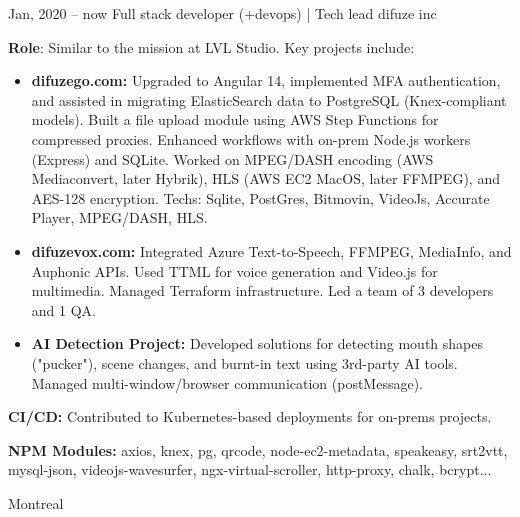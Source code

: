 \documentclass[
  a4paper,
   maincolor=cvblue,
   sectioncolor=cvblue,
   sidebarwidth=0.323\paperwidth,
]{fortysecondscv}
\begin{document}
\newpage
\restoregeometry
{}\paperwidth

\makefrontsidebar

\vspace*{-3.5em} %



\begin{cvtableNew}
  \cvitemRightNew
      {Jan, 2020 – now} %
      {Full stack developer (+devops) | Tech lead} %
      {difuze inc} %
      {
        \vspace{0.1pt} %
        \fontsize{10.8pt}{12pt}\selectfont %
        \textbf{Role}: Similar to the mission at LVL Studio. Key projects include:\vspace{5pt}

        \begin{itemize}[itemsep=-1mm, topsep=0pt, leftmargin=8pt]
          \item \textbf{difuzego.com:} Upgraded to Angular 14, implemented MFA authentication, and assisted in migrating ElasticSearch data to PostgreSQL (Knex-compliant models). Built a file upload module using AWS Step Functions for compressed proxies. Enhanced workflows with on-prem Node.js workers (Express) and SQLite. Worked on MPEG/DASH encoding (AWS Mediaconvert, later Hybrik), HLS (AWS EC2 MacOS, later FFMPEG), and AES-128 encryption. Techs: Sqlite, PostGres, Bitmovin, VideoJs, Accurate Player, MPEG/DASH, HLS.\vspace{5pt}
          \item \textbf{difuzevox.com:} Integrated Azure Text-to-Speech, FFMPEG, MediaInfo, and Auphonic APIs. Used TTML for voice generation and Video.js for multimedia. Managed Terraform infrastructure. Led a team of 3 developers and 1 QA.\vspace{5pt}
          \item \textbf{AI Detection Project:} Developed solutions for detecting mouth shapes ("pucker"), scene changes, and burnt-in text using 3rd-party AI tools. Managed multi-window/browser communication (postMessage).\vspace{5pt}
        \end{itemize}

        \textbf{CI/CD:} Contributed to Kubernetes-based deployments for on-prems projects.\vspace{5pt}

        \textbf{NPM Modules:} axios, knex, pg, qrcode, node-ec2-metadata, speakeasy, srt2vtt, mysql-json, videojs-wavesurfer, ngx-virtual-scroller, http-proxy, chalk, bcrypt...
      }
      {Montreal} %



\end{cvtableNew}
\end{document}
